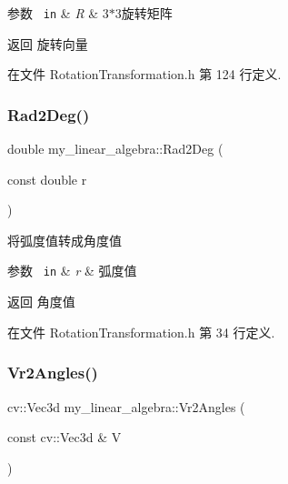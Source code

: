 \begin{DoxyParams}[1]{参数}
\mbox{\texttt{ in}}  & {\em R} & 3$\ast$3旋转矩阵 \\
\hline
\end{DoxyParams}
\begin{DoxyReturn}{返回}
旋转向量 
\end{DoxyReturn}


在文件 Rotation\+Transformation.\+h 第 124 行定义.

\mbox{\label{namespacemy__linear__algebra_a899a8fdd5b4b176a7eab324b7b8fd812}} 
\subsubsection{\texorpdfstring{Rad2Deg()}{Rad2Deg()}}
{\footnotesize\ttfamily double my\+\_\+linear\+\_\+algebra\+::\+Rad2\+Deg (\begin{DoxyParamCaption}\item[{const double}]{r }\end{DoxyParamCaption})}



将弧度值转成角度值 


\begin{DoxyParams}[1]{参数}
\mbox{\texttt{ in}}  & {\em r} & 弧度值 \\
\hline
\end{DoxyParams}
\begin{DoxyReturn}{返回}
角度值 
\end{DoxyReturn}


在文件 Rotation\+Transformation.\+h 第 34 行定义.

\mbox{\label{namespacemy__linear__algebra_aa7bec138549bc2d25e3ac6c9e664b18d}} 
\subsubsection{\texorpdfstring{Vr2Angles()}{Vr2Angles()}}
{\footnotesize\ttfamily cv\+::\+Vec3d my\+\_\+linear\+\_\+algebra\+::\+Vr2\+Angles (\begin{DoxyParamCaption}\item[{const cv\+::\+Vec3d \&}]{V }\end{DoxyParamCaption})}



